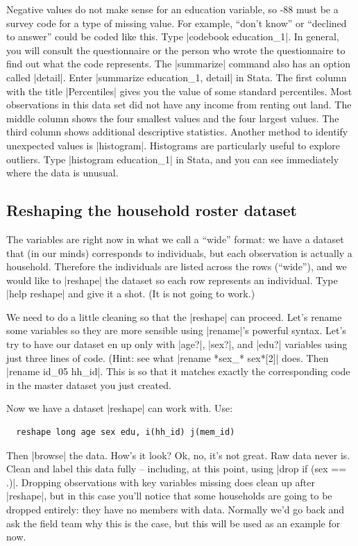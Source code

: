 \documentclass{tufte-handout}
\begin{document}
Negative values do not make sense for an education variable,
so -88 must be a survey code for a type of missing value.
For example, “don’t know” or “declined to answer” could be coded like this.
Type |codebook education_1|.
In general, you will consult the questionnaire or
the person who wrote the questionnaire to find out what the code represents.
The |summarize| command also has an option called |detail|.
Enter |summarize education_1, detail| in Stata.
The first column with the title |Percentiles|
gives you the value of some standard percentiles.
Most observations in this data set did not have any income from renting out land.
The middle column shows the four smallest values and the four largest values.
The third column shows additional descriptive statistics.
Another method to identify unexpected values is |histogram|.
Histograms are particularly useful to explore outliers.
Type |histogram education_1| in Stata,
and you can see immediately where the data is unusual.

\subsection{Reshaping the household roster dataset}

The variables are right now in what we call a “wide” format:
we have a dataset that (in our minds) corresponds to individuals,
but each observation is actually a household.
Therefore the individuals are listed across the rows (“wide”),
and we would like to |reshape| the dataset so each row represents an individual.
Type |help reshape| and give it a shot. (It is not going to work.)

We need to do a little cleaning so that the |reshape| can proceed.
Let’s rename some variables so they are more sensible
using |rename|’s powerful syntax.
Let’s try to have our dataset en up only with
|age?|, |sex?|, and |edu?| variables using just three lines of code.
(Hint: see what |rename *sex_* sex*[2]| does.
Then |rename id_05 hh_id|.
This is so that it matches exactly the corresponding code
in the master dataset you just created.

Now we have a dataset |reshape| can work with. Use:
\begin{Verbatim}
  reshape long age sex edu, i(hh_id) j(mem_id)
\end{Verbatim}
Then |browse| the data. How’s it look?
Ok, no, it’s not great. Raw data never is.
Clean and label this data fully –
including, at this point, using |drop if (sex == .)|.
Dropping observations with key variables missing
does clean up after |reshape|,
but in this case you’ll notice that some households
are going to be dropped entirely: they have no members with data.
Normally we’d go back and ask the field team why this is the case,
but this will be used as an example for now.
\end{document}
